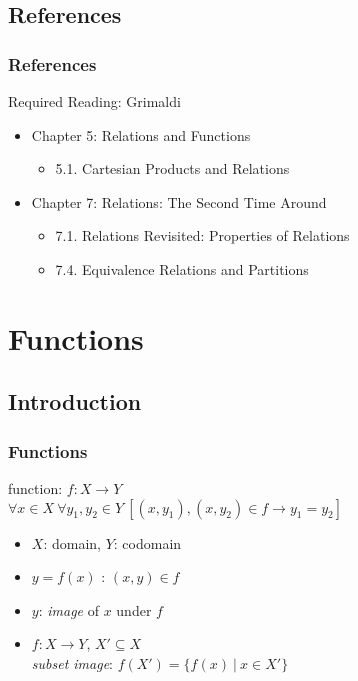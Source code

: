 \documentclass[dvipsnames]{beamer}
\begin{document}
\subsection*{References}

\begin{frame}
  \frametitle{References}

  \begin{block}{Required Reading: Grimaldi}
    \begin{itemize}
      \item Chapter 5: Relations and Functions
      \begin{itemize}
        \item 5.1. \alert{Cartesian Products and Relations}
      \end{itemize}
      \item Chapter 7: Relations: The Second Time Around
      \begin{itemize}
        \item 7.1. \alert{Relations Revisited: Properties of Relations}
        \item 7.4. \alert{Equivalence Relations and Partitions}
      \end{itemize}
    \end{itemize}
  \end{block}
\end{frame}

\section{Functions}

\subsection{Introduction}

\begin{frame}
  \frametitle{Functions}

  \begin{definition}
    \alert{function}: $f: X \rightarrow Y$\\
    $\forall x \in X~\forall y_1,y_2 \in Y~
      [(x,y_1),(x,y_2) \in f \rightarrow y_1=y_2]$
  \end{definition}

  \medskip
  \begin{itemize}
    \item $X$: \alert{domain}, $Y$: \alert{codomain}

    \pause
    \medskip
    \item $y = f(x)$ \hspace{1em} : \hspace{1em} $(x,y) \in f$
    \item $y$: \emph{image} of $x$ under $f$

    \pause
    \medskip
    \item $f: X \rightarrow Y$, $X' \subseteq X$\\
      \emph{subset image}: $f(X') = \{f(x)~|~x \in X'\}$
 \end{itemize}
\end{frame}
\end{document}
